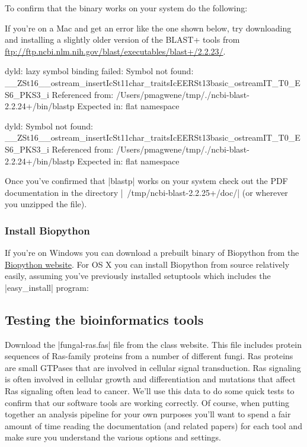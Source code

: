 To confirm that the binary works on your system do the following:
%

If you're on a Mac and get an error like the one shown below, try downloading and installing a slightly older version of the BLAST+ tools from \url{ftp://ftp.ncbi.nlm.nih.gov/blast/executables/blast+/2.2.23/}.

\begin{bash}
dyld: lazy symbol binding failed: Symbol not found: __ZSt16__ostream_insertIcSt11char_traitsIcEERSt13basic_ostreamIT_T0_ES6_PKS3_i
  Referenced from: /Users/pmagwene/tmp/./ncbi-blast-2.2.24+/bin/blastp
  Expected in: flat namespace

dyld: Symbol not found: __ZSt16__ostream_insertIcSt11char_traitsIcEERSt13basic_ostreamIT_T0_ES6_PKS3_i
  Referenced from: /Users/pmagwene/tmp/./ncbi-blast-2.2.24+/bin/blastp
  Expected in: flat namespace
\end{bash}

Once you've confirmed that |blastp| works on your system check out the PDF documentation in the directory |~/tmp/ncbi-blast-2.2.25+/doc/| (or wherever you unzipped the file).


\subsubsection{Install Biopython}

If you're on Windows you can download a prebuilt binary of Biopython from the \href{http://biopython.org/wiki/Download}{Biopython website}. For OS X you can install Biopython from source relatively easily, assuming you've previously installed setuptools which includes the |easy_install| program:
%


\subsection{Testing the bioinformatics tools}

Download the |fungal-ras.fas| file from the class website. This file includes protein sequences of Ras-family proteins from a number of different fungi.  Ras proteins are small GTPases that are involved in cellular signal transduction.  Ras signaling is often involved in cellular growth and differentiation and mutations that affect Ras signaling often lead to cancer.  We'll use this data to do some quick tests to confirm that our software tools are working correctly. Of course, when putting together an analysis pipeline for your own purposes you'll want to spend a fair amount of time reading the documentation (and related papers) for each tool and make sure you understand the various options and settings.

